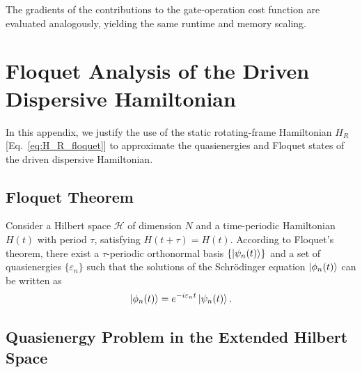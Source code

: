 \begin{appendices}
The gradients of the contributions to the gate-operation cost function are evaluated analogously, yielding the same runtime and memory scaling.

\chapter{Floquet Analysis of the Driven Dispersive Hamiltonian}
\label{app:floquet}

In this appendix, we justify the use of the static rotating-frame Hamiltonian $H_R$ [Eq.~\eqref{eq:H_R_floquet}] to approximate the quasienergies and Floquet states of the driven dispersive Hamiltonian.

\section{Floquet Theorem}

Consider a Hilbert space $\mathcal{H}$ of dimension $N$ and a time-periodic Hamiltonian $H(t)$ with period $\tau$, satisfying $H(t+\tau) = H(t)$. According to Floquet's theorem, there exist a $\tau$-periodic orthonormal basis $\{\ket{\psi_n(t)}\}$ and a set of quasienergies $\{\varepsilon_n\}$ such that the solutions of the Schrödinger equation $\ket{\phi_n(t)}$ can be written as
\begin{equation}
    \ket{\phi_n(t)} = e^{-i\varepsilon_n t} \ket{\psi_n(t)}.
\end{equation}

\section{Quasienergy Problem in the Extended Hilbert Space}


\end{appendices}
